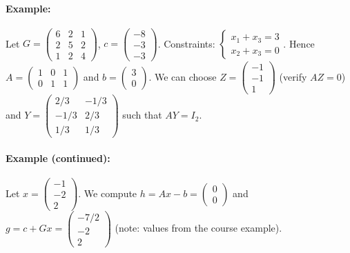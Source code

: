 \paragraph{Example:}
Let $G = \begin{pmatrix} 6 & 2 & 1 \\ 2 & 5 & 2 \\ 1 & 2 & 4 \end{pmatrix}$, $c = \begin{pmatrix} -8 \\ -3 \\ -3 \end{pmatrix}$. Constraints: $\begin{cases} x_1 + x_3 = 3 \\ x_2 + x_3 = 0 \end{cases}$.
Hence $A = \begin{pmatrix} 1 & 0 & 1 \\ 0 & 1 & 1 \end{pmatrix}$ and $b = \begin{pmatrix} 3 \\ 0 \end{pmatrix}$.
We can choose $Z = \begin{pmatrix} -1 \\ -1 \\ 1 \end{pmatrix}$ (verify $AZ=0$) and $Y = \begin{pmatrix} 2/3 & -1/3 \\ -1/3 & 2/3 \\ 1/3 & 1/3 \end{pmatrix}$ such that $AY = I_2$.

\paragraph{Example (continued):}
Let $x = \begin{pmatrix} -1 \\ -2 \\ 2 \end{pmatrix}$.
We compute $h = Ax - b = \begin{pmatrix} 0 \\ 0 \end{pmatrix}$ and $g = c + Gx = \begin{pmatrix} -7/2 \\ -2 \\ 2 \end{pmatrix}$ (note: values from the course example).

